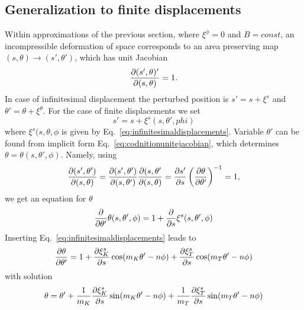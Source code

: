 \subsection{Generalization to finite displacements}
Within approximations of the previous section, where $\xi^{\phi} = 0$
and $B = const$, an incompressible deformation of space corresponds to
an area preserving map $(s, \theta) \rightarrow (s', \theta')$, which
has unit Jacobian
\begin{equation}
  \frac{\partial (s', \theta)'}{\partial (s, \theta)} = 1.
  \label{eq:codnitionunitejacobian}
\end{equation}
In case of infinitesimal displacement the perturbed position is
$s' = s + \xi^{s}$ and $\theta' = \theta + \xi^{\theta}$. For the case
of finite displacements we set
\begin{equation}
  s' = s + \xi^{s}(s, \theta', phi)
\end{equation}
where $\xi^{s}(s, \theta, \phi$ is given by
Eq.~\eqref{eq:infinitesimaldisplacements}. Variable $\theta'$ can be
found from implicit form Eq.~\eqref{eq:codnitionunitejacobian}, which
determines $\theta = \theta(s, \theta', \phi)$.
Namely, using
\begin{equation}
  \frac{\partial (s', \theta')}{\partial (s,\theta)} = \frac{\partial (s',\theta')}{\partial (s, \theta')} \frac{\partial (s, \theta'}{\partial (s, \theta)}
  = \frac{\partial s'}{\partial s} \left( \frac{\partial \theta}{\partial \theta'} \right)^{-1} = 1,
\end{equation}
we get an equation for $\theta$
\begin{equation}
  \frac{\partial }{\partial \theta'} \theta(s, \theta', \phi) = 1 + \frac{\partial }{\partial s} \xi^{s} (s, \theta', \phi)
\end{equation}
Inserting Eq.~\eqref{eq:infinitesimaldisplacements} leads to
\begin{equation}
  \frac{\partial \theta}{\partial \theta'} = 1 + \frac{\partial \xi_K^{s}}{\partial s}\cos(m_K \theta' - n \phi)
                           + \frac{\partial \xi_T^{s}}{\partial s}\cos(m_T \theta' - n \phi)
\end{equation}
with solution
\begin{equation}
  \theta = \theta' + \frac{1}{m_K} \frac{\partial \xi_K^{s}}{\partial s}\sin(m_K \theta' - n \phi)
                   + \frac{1}{m_T} \frac{\partial \xi_T^{s}}{\partial s}\sin(m_T \theta' - n \phi)
\end{equation}
